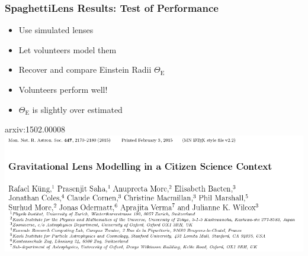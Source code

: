 \documentclass{beamer}
\begin{document}
%
%


 \begin{frame}
   \frametitle{SpaghettiLens Results: Test of Performance}
   \begin{itemize}
     \item Use simulated lenses
     \item Let volunteers model them
     \item Recover and compare Einstein Radii $\Theta_\text{E}$
     \item Volunteers perform well!
		 \item $\Theta_\text{E}$ is slightly over estimated
   \end{itemize}

   \begin{block}{arxiv:1502.00008}
     \includegraphics[width=\textwidth]{imgs/paper_sl1}
   \end{block}

 \end{frame}
\end{document}
